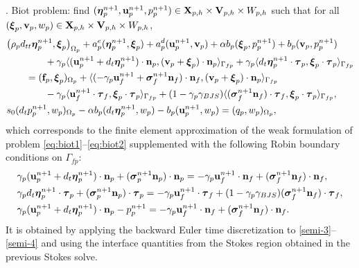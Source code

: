 \documentclass[11pt]{article}
\def\u{{\bf u}}
\def\bv{{\bf v}}
\def\n{{\bf n}}
\def\f{{\bf f}}
\def\btau{\boldsymbol{\tau}}
\def\bbeta{\boldsymbol{\eta}}
\def\bs{\boldsymbol{\sigma}}
\def\bxi{\boldsymbol{\xi}}
\def\V{{\bf V}}
\def\X{{\bf X}}
\def\O{\Omega}
\def\<{\langle}
\def\>{\rangle}
\def\dt{d_t}
\def\dtt{d_{tt}}
\begin{document}
. Biot problem: find $(\bbeta_{p}^{n+1},\u_p^{n+1},p_{p}^{n+1}) \in \X_{p,h} \times \V_{p,h} \times W_{p,h}$ such that for all $(\bxi_p,\bv_p,w_p) \in \X_{p,h}\times\V_{p,h}\times W_{p,h}$,
%
\begin{align}
  &\big( \rho_p \dtt \bbeta_{p}^{n+1},\bxi_{p}\big)_{\O_p}
  + a^e_{p}(\bbeta_{p}^{n+1},\bxi_{p})
  + a^d_{p}(\u_{p}^{n+1},\bv_{p})
  + \alpha b_p(\bxi_{p},p_{p}^{n+1})
  + b_p(\bv_{p},p_{p}^{n+1})
  \nonumber \\
  & \qquad\qquad  + \gamma_p\<(\u_p^{n+1} + \dt\bbeta_p^{n+1})\cdot\n_p,
        (\bv_p + \bxi_p)\cdot\n_p\>_{\Gamma_{fp}}
  + \gamma_p\<\dt\bbeta_p^{n+1}\cdot\btau_p,\bxi_p\cdot\btau_p\>_{\Gamma_{fp}}
  \nonumber \\
  & \qquad = (\f_{p},\bxi_{p})_{\O_p} + \<(-\gamma_p\u_f^{n+1} + \bs_f^{n+1}\n_f)\cdot\n_f,
  (\bv_p + \bxi_p)\cdot\n_p\>_{\Gamma_{fp}} \nonumber \\
  & \qquad\qquad -\gamma_p\<\u_f^{n+1}\cdot\btau_f,\bxi_p\cdot\btau_p\>_{\Gamma_{fp}}
  +(1- \gamma_p\gamma_{BJS})\<(\bs_f^{n+1}\n_f)\cdot\btau_f,\bxi_p\cdot\btau_p\>_{\Gamma_{fp}}, \\
  & s_0 (\dt p_{p}^{n+1},w_{p})_{\O_p} - \alpha b_p(\dt\bbeta_{p}^{n+1},w_{p}) - b_p(\u_{p}^{n+1},w_{p}) = (q_{p},w_{p})_{\O_p},
\end{align}
%
which corresponds to the {finite element approximation} of the weak formulation of problem \eqref{eq:biot1}--\eqref{eq:biot2} supplemented with
the following Robin boundary conditions on $\Gamma_{fp}$:
%
\begin{subequations}\label{biot-robin-mu}
\begin{align}
& \gamma_p(\u_p^{n+1} + \dt\bbeta_p^{n+1})\cdot\n_p + (\bs_p^{n+1} \n_p)\cdot\n_p =
- \gamma_p \u_f^{n+1}\cdot\n_f + (\bs_f^{n+1} \n_f)\cdot\n_f, \label{biot-robin-mu-1}\\
& \gamma_p \dt \bbeta_p^{n+1}\cdot\btau_{p} + (\bs_p^{n+1}\n_p)\cdot\btau_{p} =
- \gamma_p \u_f^{n+1}\cdot\btau_{f}
+
(1- \gamma_p\gamma_{BJS})(\bs_f^{n+1}\n_f)\cdot\btau_{f}, \label{biot-robin-mu-2}\\
& \gamma_p (\u_p^{n+1} + \dt\bbeta_p^{n+1})\cdot\n_p - p_p^{n+1} =
-\gamma_p \u_f^{n+1}\cdot\n_f + (\bs_f^{n+1} \n_f)\cdot\n_f. \label{biot-robin-mu-3}
\end{align}
\end{subequations}
%
It is obtained by applying the backward Euler time discretization to \eqref{semi-3}--\eqref{semi-4} and using the interface quantities from the Stokes region obtained in the previous Stokes solve.
\end{document}
